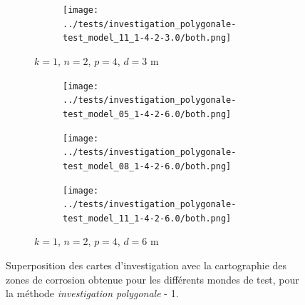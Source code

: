 \documentclass[english,RandD]{rapportPFE}  %
\begin{document}
\begin{figure}[H]
\begin{subfigure}[t]{\linewidth}
\begin{subfigure}[t]{0.2\linewidth}
					\texttt{[image: ../tests/investigation\_polygonale-test\_model\_11\_1-4-2-3.0/both.png]}
				\end{subfigure}
				\caption{$k = 1$, $n = 2$, $p = 4$, $d = 3$ m}
			\end{subfigure}
			\hfill
			\begin{subfigure}[t]{\linewidth}
				\centering
				\begin{subfigure}[t]{0.2\linewidth}
					\texttt{[image: ../tests/investigation\_polygonale-test\_model\_05\_1-4-2-6.0/both.png]}
				\end{subfigure}
				\hfill
				\begin{subfigure}[t]{0.2\linewidth}
					\texttt{[image: ../tests/investigation\_polygonale-test\_model\_08\_1-4-2-6.0/both.png]}
				\end{subfigure}
				\hfill
				\begin{subfigure}[t]{0.2\linewidth}
					\texttt{[image: ../tests/investigation\_polygonale-test\_model\_11\_1-4-2-6.0/both.png]}
				\end{subfigure}
				\caption{$k = 1$, $n = 2$, $p = 4$, $d = 6$ m}
			\end{subfigure}
			\caption{Superposition des cartes d'investigation avec la cartographie des zones de corrosion obtenue pour les différents mondes de test, pour la méthode \textit{investigation polygonale} - 1.}
			\label{fig:investigation_polygonale_resultats}
		\end{figure}
\end{document}
